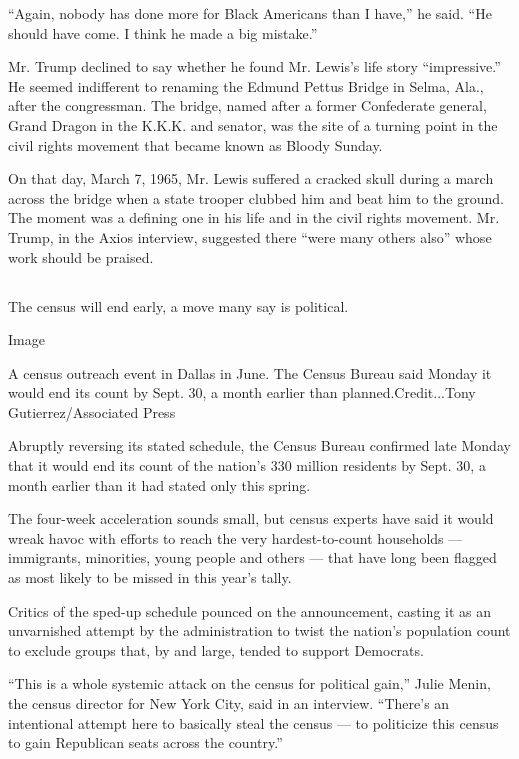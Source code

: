 ``Again, nobody has done more for Black Americans than I have,'' he
said. ``He should have come. I think he made a big mistake.''

Mr. Trump declined to say whether he found Mr. Lewis's life story
``impressive.'' He seemed indifferent to renaming the Edmund Pettus
Bridge in Selma, Ala., after the congressman. The bridge, named after a
former Confederate general, Grand Dragon in the K.K.K. and senator, was
the site of a turning point in the civil rights movement that became
known as Bloody Sunday.

On that day, March 7, 1965, Mr. Lewis suffered a cracked skull during a
march across the bridge when a state trooper clubbed him and beat him to
the ground. The moment was a defining one in his life and in the civil
rights movement. Mr. Trump, in the Axios interview, suggested there
``were many others also'' whose work should be praised.

\hypertarget{-10}{%
\subsection{}\label{-10}}

The census will end early, a move many say is political.

Image

A census outreach event in Dallas in June. The Census Bureau said Monday
it would end its count by Sept. 30, a month earlier than
planned.Credit...Tony Gutierrez/Associated Press

Abruptly reversing its stated schedule, the Census Bureau confirmed late
Monday that it would end its count of the nation's 330 million residents
by Sept. 30, a month earlier than it had stated only this spring.

The four-week acceleration sounds small, but census experts have said it
would wreak havoc with efforts to reach the very hardest-to-count
households --- immigrants, minorities, young people and others --- that
have long been flagged as most likely to be missed in this year's tally.

Critics of the sped-up schedule pounced on the announcement, casting it
as an unvarnished attempt by the administration to twist the nation's
population count to exclude groups that, by and large, tended to support
Democrats.

``This is a whole systemic attack on the census for political gain,''
Julie Menin, the census director for New York City, said in an
interview. ``There's an intentional attempt here to basically steal the
census --- to politicize this census to gain Republican seats across the
country.''

